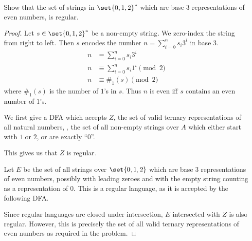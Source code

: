 \documentclass[12pt]{article}
\begin{document}
\begin{problem}
    Show that the set of strings in $\set{0, 1, 2}^*$ which are base $3$
    representations of even numbers, is regular.
\end{problem}
\begin{proof}
    Let $s \in \set{0, 1, 2}^*$ be a non-empty string.
    We zero-index the string from right to left.
    Then $s$ encodes the number $n = \sum_{i=0}^n s_i 3^i$ in base $3$.
    \begin{align*}
        n &= \sum_{i=0}^n s_i 3^i \\
        n &\equiv \sum_{i=0}^n s_i 1^i \pmod{2} \\
        n &\equiv \#_1(s) \pmod{2}
    \end{align*} where $\#_1(s)$ is the number of $1$'s in $s$.
    Thus $n$ is even iff $s$ contains an even number of $1$'s.

    We first give a DFA which accepts $Z$, the set of valid ternary
    representations of all natural numbers, \ie, the set of all non-empty
    strings over $A$ which either start with $1$ or $2$,
    or are exactly ``$0$''.
    \begin{center}
    \end{center}
    This gives us that $Z$ is regular.

    Let $E$ be the set of all strings over $\set{0, 1, 2}$ which are
    base $3$ representations of even numbers, possibly with leading zeroes
    and with the empty string counting as a representation of $0$.
    This is a regular language, as it is accepted by the following DFA.
    \begin{center}
    \end{center}
    Since regular languages are closed under intersection, $E$ intersected
    with $Z$ is also regular.
    However, this is precisely the set of all valid ternary representations
    of even numbers as required in the problem.
\end{proof}
\end{document}
